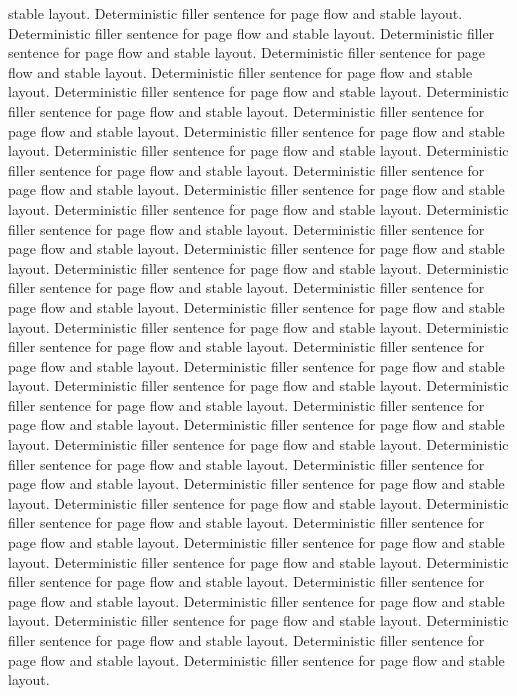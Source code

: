 \documentclass{article}
\begin{document}
stable layout. Deterministic filler sentence for page flow and stable layout. Deterministic filler sentence for page flow and stable layout. Deterministic filler sentence for page flow and stable layout. Deterministic filler sentence for page flow and stable layout. Deterministic filler sentence for page flow and stable layout. Deterministic filler sentence for page flow and stable layout. Deterministic filler sentence for page flow and stable layout. Deterministic filler sentence for page flow and stable layout. Deterministic filler sentence for page flow and stable layout. Deterministic filler sentence for page flow and stable layout. Deterministic filler sentence for page flow and stable layout. Deterministic filler sentence for page flow and stable layout. Deterministic filler sentence for page flow and stable layout. Deterministic filler sentence for page flow and stable layout. Deterministic filler sentence for page flow and stable layout. Deterministic filler sentence for page flow and stable layout. Deterministic filler sentence for page flow and stable layout. Deterministic filler sentence for page flow and stable layout. Deterministic filler sentence for page flow and stable layout. Deterministic filler sentence for page flow and stable layout. Deterministic filler sentence for page flow and stable layout. Deterministic filler sentence for page flow and stable layout. Deterministic filler sentence for page flow and stable layout. Deterministic filler sentence for page flow and stable layout. Deterministic filler sentence for page flow and stable layout. Deterministic filler sentence for page flow and stable layout. Deterministic filler sentence for page flow and stable layout. Deterministic filler sentence for page flow and stable layout. Deterministic filler sentence for page flow and stable layout. Deterministic filler sentence for page flow and stable layout. Deterministic filler sentence for page flow and stable layout. Deterministic filler sentence for page flow and stable layout. Deterministic filler sentence for page flow and stable layout. Deterministic filler sentence for page flow and stable layout. Deterministic filler sentence for page flow and stable layout. Deterministic filler sentence for page flow and stable layout. Deterministic filler sentence for page flow and stable layout. Deterministic filler sentence for page flow and stable layout. Deterministic filler sentence for page flow and stable layout. Deterministic filler sentence for page flow and stable layout. Deterministic filler sentence for page flow and stable layout. Deterministic filler sentence for page flow and stable layout. Deterministic filler sentence for page flow and stable layout. Deterministic filler sentence for page flow and stable layout. Deterministic filler sentence for page flow and stable layout. 
\end{document}
